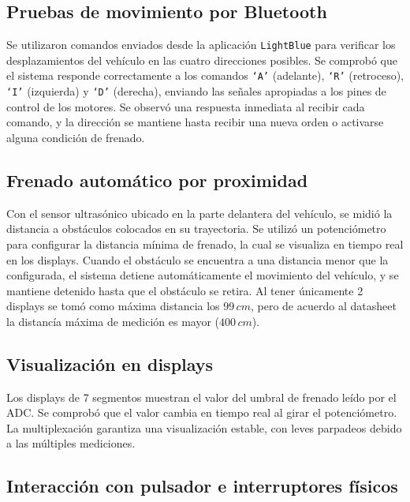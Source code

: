 \documentclass[]{article}
\begin{document}
	\subsection{Pruebas de movimiento por Bluetooth}
	
	Se utilizaron comandos enviados desde la aplicación \texttt{LightBlue} para verificar los desplazamientos del vehículo en las cuatro direcciones posibles. Se comprobó que el sistema responde correctamente a los comandos \texttt{‘A’} (adelante), \texttt{‘R’} (retroceso), \texttt{‘I’} (izquierda) y \texttt{‘D’} (derecha), enviando las señales apropiadas a los pines de control de los motores. Se observó una respuesta inmediata al recibir cada comando, y la dirección se mantiene hasta recibir una nueva orden o activarse alguna condición de frenado.
	
	\subsection{Frenado automático por proximidad}
	
	Con el sensor ultrasónico ubicado en la parte delantera del vehículo, se midió la distancia a obstáculos colocados en su trayectoria. Se utilizó un potenciómetro para configurar la distancia mínima de frenado, la cual se visualiza en tiempo real en los displays. Cuando el obstáculo se encuentra a una distancia menor que la configurada, el sistema detiene automáticamente el movimiento del vehículo, y se mantiene detenido hasta que el obstáculo se retira. Al tener únicamente 2 displays se tomó como máxima distancia los $99\,cm$, pero de acuerdo al datasheet la distancía máxima de medición es mayor ($400\,cm$).
	
	\newpage
	\thispagestyle{fancy}
	
	\subsection{Visualización en displays}
	
	Los displays de 7 segmentos muestran el valor del umbral de frenado leído por el ADC. Se comprobó que el valor cambia en tiempo real al girar el potenciómetro. La multiplexación garantiza una visualización estable, con leves parpadeos debido a las múltiples mediciones.
	
	\subsection{Interacción con pulsador e interruptores físicos}
	
\end{document}
